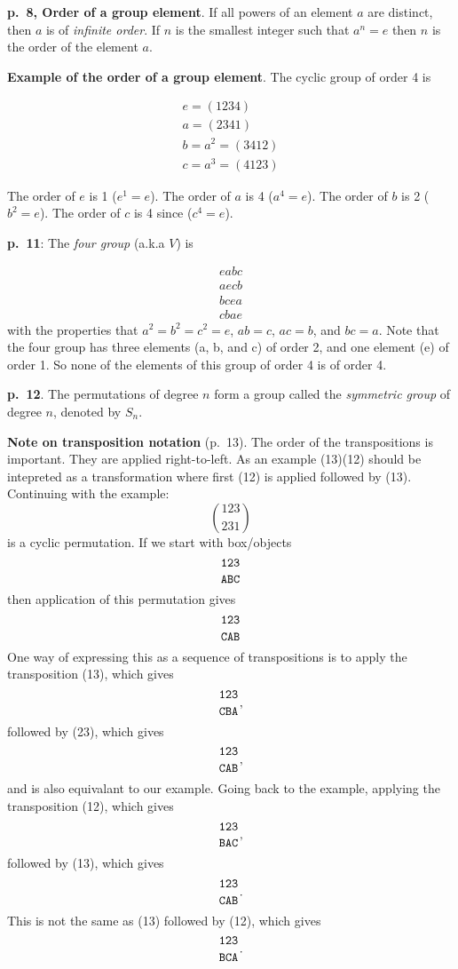 {\bf p.\ 8, Order of a group element}. If all powers of an element $a$
are distinct, then $a$ is of {\it infinite order}. If $n$ is the
smallest integer such that $a^n = e$ then $n$ is the order of the
element $a$.

{\bf Example of the order of a group element}. The cyclic group of order 4 is

\begin{equation*}
\begin{split}
e = (1234) \\
a = (2341) \\
b = a^2 = (3412) \\
c = a^3 = (4123)
\end{split}
\end{equation*}

The order of $e$ is 1 ($e^1 = e$). The order of $a$ is 4 ($a^4 = e$). The order of $b$ is 2 ($b^2 = e$). The order of $c$ is 4 since ($c^4 = e$).

{\bf p.\ 11}: The {\it four group} (a.k.a $V$) is

\begin{equation}
\begin{split}
  eabc \\
  aecb \\
  bcea \\
  cbae
\end{split}
\end{equation}
with the properties that $a^2 = b^2 = c^2 = e$, $ab = c$, $ac = b$,
and $bc = a$. Note that the four group has three elements (a, b, and
c) of order 2, and one element (e) of order 1. So none of the elements
of this group of order 4 is of order 4.

{\bf p.\ 12}. The permutations of degree $n$ form a group called the
{\it symmetric group} of degree $n$, denoted by $S_n$.

{\bf Note on transposition notation} (p.\ 13). The order of the
transpositions is important. They are applied right-to-left. As an example
(13)(12) should be intepreted as a transformation where
first (12) is applied followed by (13). Continuing with the example:
$$
\genfrac(){0pt}0{123}{231}
$$
is a cyclic permutation. If we start with box/objects
$$
\genfrac{}{}{0pt}0{\tt 123}{\tt ABC}
$$
then application of this permutation gives
$$
\genfrac{}{}{0pt}0{\tt 123}{\tt CAB}
$$
One way of expressing this as a sequence of transpositions is to apply the
transposition (13), which gives
$$
\genfrac{}{}{0pt}0{\tt 123}{\tt CBA},
$$
followed by (23), which gives
$$
\genfrac{}{}{0pt}0{\tt 123}{\tt CAB},
$$
and is also equivalant to our example. Going back to the example, applying the
transposition (12), which gives
$$
\genfrac{}{}{0pt}0{\tt 123}{\tt BAC},
$$
followed by (13), which gives
$$
\genfrac{}{}{0pt}0{\tt 123}{\tt CAB}.
$$
This is not the same as (13) followed by (12), which gives
$$
\genfrac{}{}{0pt}0{\tt 123}{\tt BCA}.
$$

